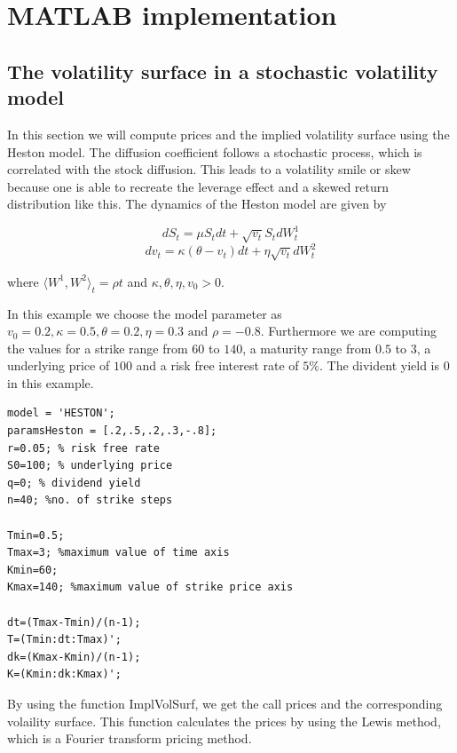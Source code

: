 \section{MATLAB implementation}

\subsection{The volatility surface in a stochastic volatility model}

\begin{par}
In this section we will compute prices and the implied volatility surface using the Heston model. The diffusion coefficient follows a stochastic process, which is correlated with the stock diffusion. This leads to a volatility smile or skew because one is able to recreate the leverage effect and a skewed return distribution like this. The dynamics of the Heston model are given by
\end{par} \vspace{1em}
\begin{par}
$$dS_t = \mu S_tdt + \sqrt{v_t}S_tdW_t^1$$
$$dv_t = \kappa (\theta - v_t)dt
+ \eta\sqrt{v_t}dW_t^2$$
\end{par} \vspace{1em}
\begin{par}
where $\langle W^1,W^2\rangle_t = \rho t$ and $\kappa , \theta , \eta , v_0 >0$.
\end{par} \vspace{1em}
\begin{par}
In this example we choose the model parameter as $v_0 = 0.2, \kappa = 0.5, \theta=0.2, \eta = 0.3\textrm{ and } \rho = -0.8$. Furthermore we are computing the values for a strike range from $60$ to $140$, a maturity range from $0.5$ to $3$, a underlying price of $100$ and a risk free interest rate of $5\%$. The divident yield is $0$ in this example.
\end{par} \vspace{1em}
\begin{verbatim}
model = 'HESTON';
paramsHeston = [.2,.5,.2,.3,-.8];
r=0.05; % risk free rate
S0=100; % underlying price
q=0; % dividend yield
n=40; %no. of strike steps

Tmin=0.5;
Tmax=3; %maximum value of time axis
Kmin=60;
Kmax=140; %maximum value of strike price axis

dt=(Tmax-Tmin)/(n-1);
T=(Tmin:dt:Tmax)';
dk=(Kmax-Kmin)/(n-1);
K=(Kmin:dk:Kmax)';
\end{verbatim}
\begin{par}
By using the function ImplVolSurf, we get the call prices and the corresponding volaility surface. This function calculates the prices by using the Lewis method, which is a Fourier transform pricing method.
\end{par} \vspace{1em}
